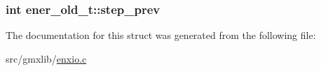 \hypertarget{structener__old__t_ac5943539fd94320fea68a8ed5c439727}{
\subsubsection[{step\-\_\-prev}]{\setlength{\rightskip}{0pt plus 5cm}int {\bf ener\-\_\-old\-\_\-t\-::step\-\_\-prev}}}\label{structener__old__t_ac5943539fd94320fea68a8ed5c439727}


\-The documentation for this struct was generated from the following file\-:\begin{DoxyCompactItemize}
\item 
src/gmxlib/\hyperlink{enxio_8c}{enxio.\-c}\end{DoxyCompactItemize}
